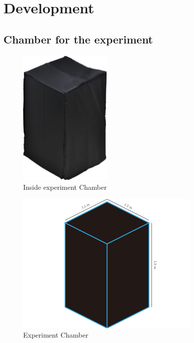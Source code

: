 \chapter{Development}

\label{ch:Development}

\setlength{\parindent}{4em}
\setlength{\parskip}{1em}
\renewcommand{\baselinestretch}{1.5}

\section{Chamber for the experiment}

\begin{figure}[ht]
	\centering
	\includegraphics[width=0.4\textwidth]{chapter6/blackbox.jpg}
	\caption{Inside experiment Chamber}
\end{figure}

\begin{figure}[ht]
	\centering
	\includegraphics[width=0.8\textwidth]{chapter6/dark_wire.pdf}
	\caption{Experiment Chamber}
\end{figure}

